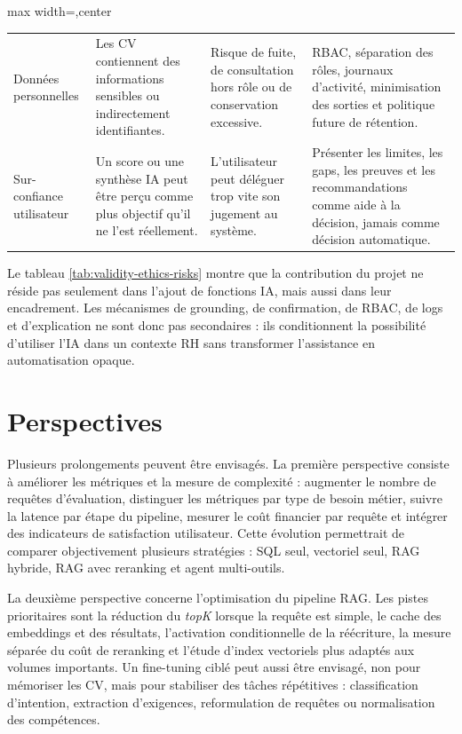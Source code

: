 \begin{table}[H]
\begin{adjustbox}{max width=\linewidth,center}
\begin{tabularx}{\textwidth}{>{\bfseries\raggedright\arraybackslash}p{2.6cm}>{\raggedright\arraybackslash}X>{\raggedright\arraybackslash}X>{\raggedright\arraybackslash}X}
    Données personnelles & Les CV contiennent des informations sensibles ou indirectement identifiantes. & Risque de fuite, de consultation hors rôle ou de conservation excessive. & RBAC, séparation des rôles, journaux d'activité, minimisation des sorties et politique future de rétention. \\
    Sur-confiance utilisateur & Un score ou une synthèse IA peut être perçu comme plus objectif qu'il ne l'est réellement. & L'utilisateur peut déléguer trop vite son jugement au système. & Présenter les limites, les gaps, les preuves et les recommandations comme aide à la décision, jamais comme décision automatique. \\
    \bottomrule
  \end{tabularx}
  \end{adjustbox}
\end{table}

Le tableau \ref{tab:validity-ethics-risks} montre que la contribution du projet ne réside pas seulement dans l'ajout de fonctions IA, mais aussi dans leur encadrement. Les mécanismes de grounding, de confirmation, de RBAC, de logs et d'explication ne sont donc pas secondaires : ils conditionnent la possibilité d'utiliser l'IA dans un contexte RH sans transformer l'assistance en automatisation opaque.

\section*{Perspectives}
Plusieurs prolongements peuvent être envisagés. La première perspective consiste à améliorer les métriques et la mesure de complexité : augmenter le nombre de requêtes d'évaluation, distinguer les métriques par type de besoin métier, suivre la latence par étape du pipeline, mesurer le coût financier par requête et intégrer des indicateurs de satisfaction utilisateur. Cette évolution permettrait de comparer objectivement plusieurs stratégies : SQL seul, vectoriel seul, RAG hybride, RAG avec reranking et agent multi-outils.

La deuxième perspective concerne l'optimisation du pipeline RAG. Les pistes prioritaires sont la réduction du \textit{topK} lorsque la requête est simple, le cache des embeddings et des résultats, l'activation conditionnelle de la réécriture, la mesure séparée du coût de reranking et l'étude d'index vectoriels plus adaptés aux volumes importants. Un fine-tuning ciblé peut aussi être envisagé, non pour mémoriser les CV, mais pour stabiliser des tâches répétitives : classification d'intention, extraction d'exigences, reformulation de requêtes ou normalisation des compétences.

